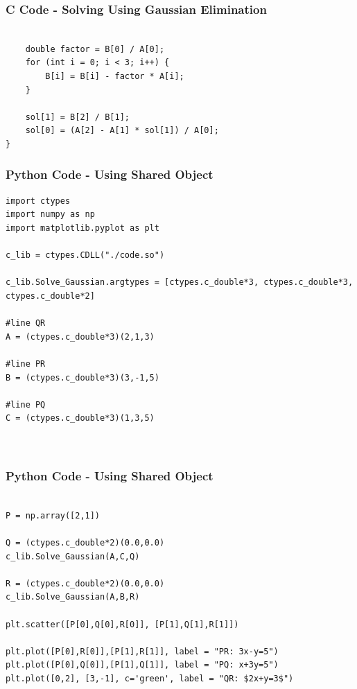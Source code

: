 \documentclass{beamer}
\begin{document}
\begin{frame}[fragile]
    \frametitle{C Code - Solving Using Gaussian Elimination}

    \begin{lstlisting}
    
    double factor = B[0] / A[0];
    for (int i = 0; i < 3; i++) {
        B[i] = B[i] - factor * A[i];
    }

    sol[1] = B[2] / B[1];
    sol[0] = (A[2] - A[1] * sol[1]) / A[0];
}

    \end{lstlisting}

\end{frame}

\begin{frame}[fragile]
    \frametitle{Python Code - Using Shared Object}
    \begin{lstlisting}
import ctypes
import numpy as np
import matplotlib.pyplot as plt

c_lib = ctypes.CDLL("./code.so")

c_lib.Solve_Gaussian.argtypes = [ctypes.c_double*3, ctypes.c_double*3, ctypes.c_double*2]

#line QR
A = (ctypes.c_double*3)(2,1,3)

#line PR
B = (ctypes.c_double*3)(3,-1,5)

#line PQ
C = (ctypes.c_double*3)(1,3,5)



\end{lstlisting}
\end{frame}

\begin{frame}[fragile]
    \frametitle{Python Code - Using Shared Object}
    \begin{lstlisting}

P = np.array([2,1])

Q = (ctypes.c_double*2)(0.0,0.0)
c_lib.Solve_Gaussian(A,C,Q)

R = (ctypes.c_double*2)(0.0,0.0)
c_lib.Solve_Gaussian(A,B,R)

plt.scatter([P[0],Q[0],R[0]], [P[1],Q[1],R[1]])

plt.plot([P[0],R[0]],[P[1],R[1]], label = "PR: 3x-y=5")
plt.plot([P[0],Q[0]],[P[1],Q[1]], label = "PQ: x+3y=5")
plt.plot([0,2], [3,-1], c='green', label = "QR: $2x+y=3$")

\end{lstlisting}
\end{frame}
\end{document}
